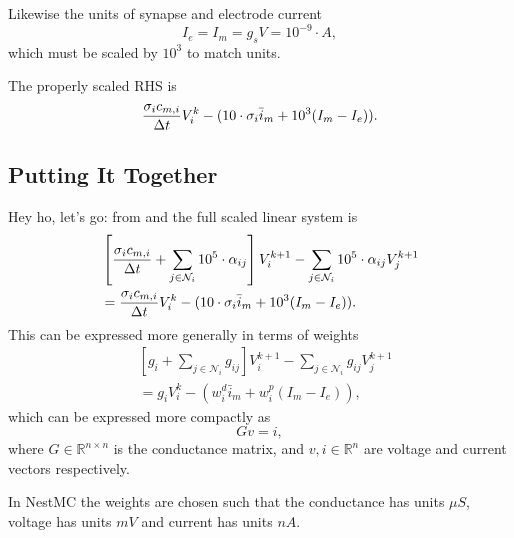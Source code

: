 Likewise the units of synapse and electrode current
\begin{equation}
    \label{eq:Im_unit}
    \unit{ I_e } = \unit{ I_m } = \unit{ g_s } \unit{ V }
                 = 10^{-9}\cdot A,
\end{equation}
which must be scaled by $10^3$ to match units.

The properly scaled RHS is
\begin{equation}
    \label{eq:linsys_RHS_scaled}
    \frac{\sigma_i c_{m,i}}{\Delta t} V_i^k -
        (10\cdot\sigma_i \bar{i}_m + 10^3(I_m - I_e)).
\end{equation}

\subsection{Putting It Together}
Hey ho, let's go: from  and  the full scaled linear system is
\begin{align}
    &
    \left[
        \frac{\sigma_i c_{m,i}}{\Delta t} + \sum_{j\in\mathcal{N}_i} {10^5\cdot\alpha_{ij}}
    \right]
    V_i^{k+1} - \sum_{j\in\mathcal{N}_i} { 10^5\cdot\alpha_{ij} V_j^{k+1}} \nonumber \\
       & =
    \frac{\sigma_i c_{m,i}}{\Delta t} V_i^k -
        (10\cdot\sigma_i \bar{i}_m + 10^3(I_m - I_e)).
\end{align}
This can be expressed more generally in terms of weights
\begin{align}
    &
    \left[
        g_i + \sum_{j\in\mathcal{N}_i} {g_{ij}}
    \right]
    V_i^{k+1} - \sum_{j\in\mathcal{N}_i} { g_{ij} V_j^{k+1}} \nonumber \\
       & =
    g_i V_i^k -
        (w_i^d \bar{i}_m + w_i^p(I_m - I_e)),
\end{align}
which can be expressed more compactly as
\begin{equation}
    Gv=i,
\end{equation}
where $G\in\mathbb{R}^{n\times n}$ is the conductance matrix, and $v, i \in \mathbb{R}^{n}$ are voltage and current vectors respectively.

In NestMC the weights are chosen such that the conductance has units $\mu S$, voltage has units $mV$ and current has units $nA$.

